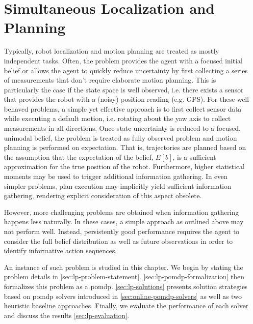 \chapter{Simultaneous Localization and Planning}\label{chap:localization-and-planning}


Typically, robot localization and motion planning are treated as mostly
independent tasks. Often, the problem provides the agent with a focused initial
belief or allows the agent to quickly reduce uncertainty by first collecting
a series of measurements that don't require elaborate motion planning. This is
particularly the case if the state space is well observed, i.e. there exists
a sensor that provides the robot with a (noisy) position reading (e.g. GPS).
For these well behaved problems, a simple yet effective approach is to first
collect sensor data while executing a default motion, i.e. rotating about the
yaw axis to collect measurements in all directions. Once state uncertainty is
reduced to a focused, unimodal belief, the problem is treated as fully observed
problem and motion planning is performed on expectation. That is, trajectories
are planned based on the assumption that the expectation of the belief, $E[b]$,
is a sufficient approximation for the true position of the robot. Furthermore,
higher statistical moments  may be used
to trigger additional information gathering. In even simpler problems, plan
execution may implicitly yield sufficient information gathering, rendering
explicit consideration of this aspect obsolete.

However, more challenging problems are obtained when information gathering
happens less naturally. In these cases, a simple approach as outlined above
may not perform well. Instead, persistently good performance requires the agent
to consider the full belief distribution as well as future observations in
order to identify informative action sequences.

An instance of such problem is studied in this chapter. We begin by stating the
problem details in \cref{sec:lp-problem-statement}.
\cref{sec:lp-pomdp-formalization} then formalizes this problem as a \ac{pomdp}.
\cref{sec:lp-solutions} presents solution strategies based on \ac{pomdp}
solvers introduced in \cref{sec:online-pomdp-solvers} as well as two heuristic
baseline approaches. Finally, we evaluate the performance of each solver and
discuss the results \cref{sec:lp-evaluation}.

